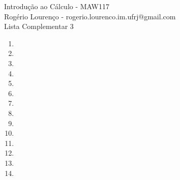 \documentclass{article}
\begin{document}
\begin{flushleft}
	Introdução ao Cálculo - MAW117\\
	Rogério Lourenço - rogerio.lourenco.im.ufrj@gmail.com\\
	Lista Complementar 3
\end{flushleft}

\begin{enumerate}
	\item 
	\item 
	\item 
	\item 
	\item 
	\item 
	\item 
	\item 
	\item 
	\item 
	\item 
	\item 
	\item 
	\item 
\end{enumerate}
\end{document}
